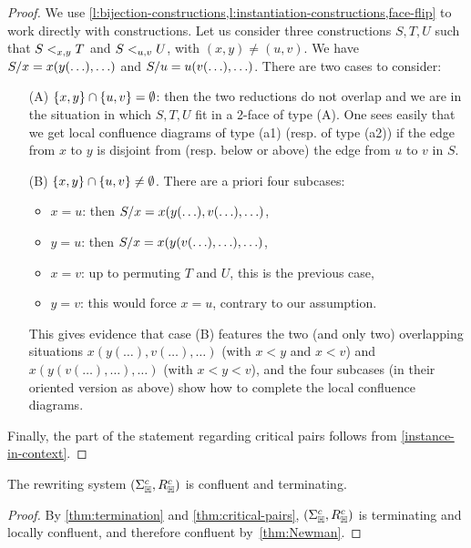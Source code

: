 \begin{proof}
  We use \cref{l:bijection-constructions,l:instantiation-constructions,face-flip} to work directly with constructions. 
Let us consider three constructions $S,T,U$ such that $S<_{x,y}T$ and $S <_{u,v} U$, with $(x,y)\neq(u,v)$.
  We have~$S/x=x(y(\ldots),\ldots)$ and $S/u=u(v(\ldots),\ldots)$. 
  There are two cases to consider:
  \begin{itemize}
  \item[(A)] $\left\{x,y\right\}\cap\left\{u,v\right\}=\emptyset$: then the two reductions do not overlap and we are in the situation in which $S,T,U$ fit in a 2-face of type (A).  One sees easily that we get local confluence diagrams of type (a1) (resp. of type (a2)) if the edge from $x$ to $y$ is disjoint from (resp. below or above) the edge  from $u$ to $v$ in $S$. 
  \item[(B)] $\left\{x,y\right\}\cap\left\{u,v\right\}\neq\emptyset$. 
  There are a priori four subcases:
  \begin{itemize}
  \item $x=u$: then $S/x=x(y(\ldots),v(\ldots),\ldots)$,
  \item $y=u$: then  $S/x=x(y(v(\ldots),\ldots),\ldots)$,
  \item $x=v$: up to permuting $T$ and $U$, this is the previous case,
  \item $y=v$: this would force $x=u$, contrary to our assumption.
  \end{itemize}
  This gives evidence that case (B) features the two (and only two) overlapping situations $x(y(\ldots),v(\ldots),\ldots)$ (with $x<y$ and $x<v$) and 
  $x(y(v(\ldots),\ldots),\ldots)$ (with $x<y<v$), and the four subcases  (in their oriented version as above) show how to complete the local confluence diagrams.  
\end{itemize}
Finally, the part of the statement regarding critical pairs follows from \cref{instance-in-context}.
\end{proof}


\begin{thm}
  \label{thm:confluent}
  The rewriting system $(\Sigma_{\mathbb H}^c ,R_{\mathbb H}^c)$ is confluent and terminating.
\end{thm}

\begin{proof}
  By \cref{thm:termination} and \cref{thm:critical-pairs}, $(\Sigma_{\mathbb H}^c,R_{\mathbb H}^c)$ is terminating and locally confluent, and therefore confluent by~\cref{thm:Newman}.
\end{proof}

